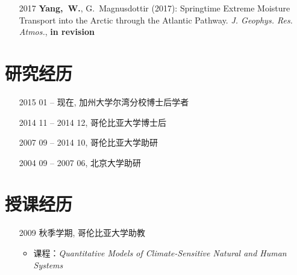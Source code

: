 \documentclass[11pt]{article}
\newcommand{\richard}{\href{http://www.ldeo.columbia.edu/res/div/ocp/people/seager/}{Richard Seager}}
\newcommand{\cane}{\href{http://www.ldeo.columbia.edu/user/mcane}{Mark A. Cane}}
\newcommand{\gudrun}{\href{http://sites.uci.edu/magnusdottir}{Gudrun Magnusdottir}}
\begin{document}
\begin{CJK*}{UTF8}{gkai}
\begin{itemize}[itemsep=0.3em,parsep=0pt, leftmargin=10ex]
	\item[2017] \textbf{Yang,~W.}, G.~Magnusdottir (2017): Springtime Extreme Moisture Transport into the Arctic through the Atlantic Pathway. \emph{J. Geophys. Res. Atmos.}, \textbf{in revision}
\end{itemize}


\section{研究经历}
\begin{itemize}[leftmargin=10ex,label={},noitemsep,nolistsep]
	\item[2015] 01 -- 现在, 加州大学尔湾分校博士后学者
	\item[2014] 11 -- 2014 12, 哥伦比亚大学博士后
	\item[2007] 09 -- 2014 10,  哥伦比亚大学助研
	\item[2004] 09 -- 2007 06, 北京大学助研
	\end{itemize}


\section{授课经历} 
\begin{itemize}[leftmargin=10ex,label={},noitemsep,nolistsep]
	\item[2009] 秋季学期, 哥伦比亚大学助教
	\begin{itemize}[leftmargin=0ex,label={},noitemsep,nolistsep]
		\item  课程：\textit{Quantitative Models of Climate-Sensitive Natural and Human Systems}
		\end{itemize}
		

\end{itemize}
\end{CJK*}
\end{document}

